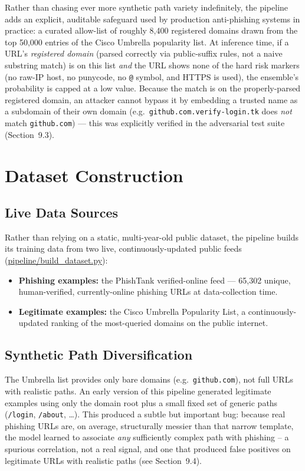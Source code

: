 \documentclass[11pt,a4paper]{report}
\begin{document}
Rather than chasing ever more synthetic path variety indefinitely, the pipeline adds
an explicit, auditable safeguard used by production anti-phishing systems in
practice: a curated allow-list of roughly 8,400 registered domains drawn from the
top 50,000 entries of the Cisco Umbrella popularity list. At inference time, if a
URL's \emph{registered domain} (parsed correctly via public-suffix rules, not a
naive substring match) is on this list \emph{and} the URL shows none of the hard
risk markers (no raw-IP host, no punycode, no \texttt{@} symbol, and HTTPS is used),
the ensemble's probability is capped at a low value. Because the match is on the
properly-parsed registered domain, an attacker cannot bypass it by embedding a
trusted name as a subdomain of their own domain (e.g.\
\texttt{github.com.verify-login.tk} does \emph{not} match \texttt{github.com}) ---
this was explicitly verified in the adversarial test suite (Section~9.3).

\chapter{Dataset Construction}

\section{Live Data Sources}
Rather than relying on a static, multi-year-old public dataset, the pipeline builds
its training data from two live, continuously-updated public feeds
(\url{pipeline/build_dataset.py}):

\begin{itemize}[leftmargin=1.4em]
  \item \textbf{Phishing examples:} the PhishTank verified-online feed --- 65{,}302
  unique, human-verified, currently-online phishing URLs at data-collection time.
  \item \textbf{Legitimate examples:} the Cisco Umbrella Popularity List, a
  continuously-updated ranking of the most-queried domains on the public internet.
\end{itemize}

\section{Synthetic Path Diversification}
The Umbrella list provides only bare domains (e.g.\ \texttt{github.com}), not full
URLs with realistic paths. An early version of this pipeline generated legitimate
examples using only the domain root plus a small fixed set of generic paths
(\texttt{/login}, \texttt{/about}, \ldots). This produced a subtle but important
bug: because real phishing URLs are, on average, structurally messier than that
narrow template, the model learned to associate \emph{any} sufficiently complex path
with phishing -- a spurious correlation, not a real signal, and one that produced
false positives on legitimate URLs with realistic paths (see Section~9.4).
\end{document}
